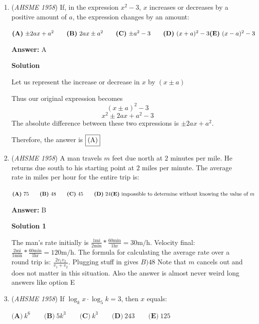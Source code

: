 \begin{enumerate}
	\item (\textit{AHSME 1958}) If, in the expression $x^2 - 3$, $x$ increases or decreases by a positive amount of $a$, the expression changes by an amount:


 $\textbf{(A)}\ {\pm 2ax + a^2}\qquad  \textbf{(B)}\ {2ax \pm a^2}\qquad  \textbf{(C)}\ {\pm a^2 - 3} \qquad  \textbf{(D)}\ {(x + a)^2 - 3}\qquad\\  \textbf{(E)}\ {(x - a)^2 - 3}$

 \textbf{Answer: }A



\textbf{Solution}

Let us represent the increase or decrease in $x$ by $(x \pm a)$

 Thus our original expression becomes
 \[(x \pm a)^2 - 3\]
 \[x^2 \pm 2ax + a^2 - 3\]The absolute difference between these two expressions is $\pm 2ax + a^2$.

 Therefore, the answer is $\fbox{(A)}$



	\item (\textit{AHSME 1958}) A man travels $m$ feet due north at $2$ minutes per mile. He returns due south to his starting point at $2$ miles per minute. The average rate in miles per hour for the entire trip is:


 $\textbf{(A)}\ 75\qquad  \textbf{(B)}\ 48\qquad  \textbf{(C)}\ 45\qquad  \textbf{(D)}\ 24\qquad\\  \textbf{(E)}\ \text{impossible to determine without knowing the value of }{m}$

 \textbf{Answer: }B



\textbf{Solution 1}

The man's rate initially is $\frac{1 \text{mi}}{2 \text{min}}*\frac{60 \text{min}}{1 \text{hr}}=30 \text{m/h}$. Velocity final: $\frac{2 \text{mi}}{1 \text{min}}*\frac{60 \text{min}}{1 \text{hr}}=120 \text{m/h}$. The formula for calculating the average rate over a round trip is: $\frac{2v_1 v_2}{v_1 + v_2}$. Plugging stuff in gives $\boxed{B) 48}$ Note that $m$ cancels out and does not matter in this situation. Also the answer is almost never weird long answers like option E

 


	\item (\textit{AHSME 1958}) If $\log_{k}{x}\cdot \log_{5}{k} = 3$, then $x$ equals:


 $\textbf{(A)}\ k^6\qquad  \textbf{(B)}\ 5k^3\qquad  \textbf{(C)}\ k^3\qquad  \textbf{(D)}\ 243\qquad  \textbf{(E)}\ 125$


\end{enumerate}
